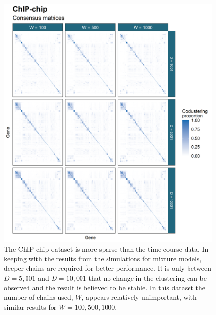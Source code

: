 \documentclass[]{article}
\begin{document}
\begin{figure}
	\centering
	\includegraphics[scale=0.8]{./Images/Yeast/ChIP-chipCMcomparison.png}
	\caption{The ChIP-chip dataset is more sparse than the time course  data. In keeping with the results from the simulations for mixture models, deeper chains are required for better performance. It is only between $D=5,001$ and $D=10,001$ that no change in the clustering can be observed and the result is believed to be stable. In this dataset the number of chains used, $W$, appears relatively unimportant, with similar results for $W=100, 500, 1000$.}
	\label{fig:chipchipCMs}
\end{figure}
\end{document}
